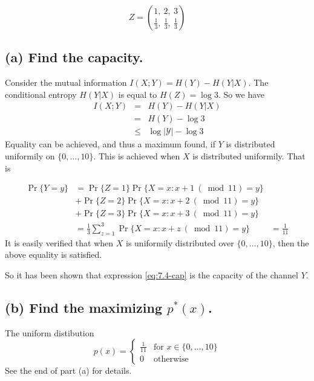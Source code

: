 \documentclass[12pt]{article}
\newcommand{\setbrace}[1]{{\{#1\}}}
\begin{document}
\begin{tiny}
\begin{multicols}{2}
\begin{equation*}
    Z = {{1,\ 2,\ 3}\choose{\frac{1}{3},\ \frac{1}{3},\ \frac{1}{3}}}
\end{equation*}


\subsection*{\textbf{(a)} Find the capacity.}

Consider the mutual information $I(X;Y) = H(Y) - H(Y|X)$. The conditional
entropy $H(Y|X)$ is equal to $H(Z)=\log 3$.
So we have
\begin{eqnarray}
    I(X;Y) &=& H(Y) - H(Y|X) \nonumber \\
        &=& H(Y) - \log 3 \nonumber \\
        &\leq& \log {\vert \mathcal{Y} \vert} - \log 3 \label{eq:7.4-cap}
\end{eqnarray}
Equality can be achieved, and thus a maximum found, if $Y$ is distributed
uniformily on $\setbrace{0,\dots,10}$. This is achieved when $X$ is
distributed uniformily. That is

\begin{align*}
    \Pr \setbrace{Y=y} &= 
    \Pr \setbrace{Z=1} \Pr \setbrace{X = x : x+1\ (\bmod 11) = y} \\
    &+ \Pr \setbrace{Z=2} \Pr \setbrace{X = x : x+2\ (\bmod 11) = y} \\
    &+ \Pr \setbrace{Z=3} \Pr \setbrace{X = x : x+3\ (\bmod 11) = y} \\
    &= \frac{1}{3}\sum_{z=1}^{3} \Pr \setbrace{X = x : x+z\ (\bmod 11) = y}
    &= \frac{1}{11}
\end{align*}
It is easily verified that when $X$ is uniformily distributed over
$\setbrace{0,\dots,10}$, then the above equality is satisfied.

So it has been shown that expression \ref{eq:7.4-cap} is the capacity of
the channel $Y$.

\subsection*{\textbf{(b)} Find the maximizing $p^*(x)$.}

The uniform distibution
\begin{equation*}
    p(x)= \begin{cases}
        \frac{1}{11} & \text{for $x \in \setbrace{0,\dots,10}$} \\
        0 & \text{otherwise}
    \end{cases}
\end{equation*}
See the end of part (a) for details.


\end{multicols}
\end{tiny}
\end{document}
